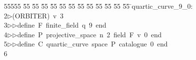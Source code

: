 %
%
\begin{tabbing}
55555 \= 55 \= 55 \= 55 \= 55 \= 55 \= 55 \= 55 \= 55 \= 55 \= 55 \= 55 \= 55 \= \>quartic\_curve\_9\_0:\ \\[0pt]
2\>$\triangleright$\>(ORBITER)\ v\ 3\ \\[0pt]
3\>$\triangleright$\>$\triangleright$\>define\ F\ finite\_field\ q\ 9\ end\ \\[0pt]
4\>$\triangleright$\>$\triangleright$\>define\ P\ projective\_space\ n\ 2\ field\ F\ v\ 0\ end\ \\[0pt]
5\>$\triangleright$\>$\triangleright$\>define\ C\ quartic\_curve\ space\ P\ catalogue\ 0\ end\\[0pt]
6\>\end{tabbing}
